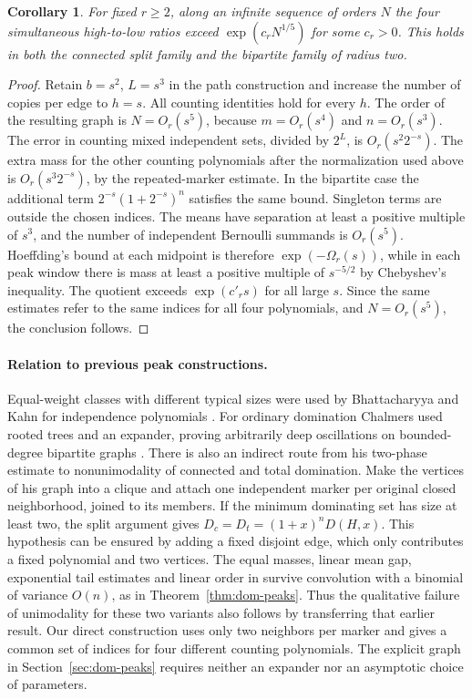 \documentclass[11pt,a4paper]{article}
\newtheorem{corollary}[theorem]{Corollary}
\begin{document}
\begin{corollary}\label{cor:power-contrast}
For fixed $r\ge2$, along an infinite sequence of orders $N$ the four simultaneous high-to-low ratios exceed $\exp(c_r N^{1/5})$ for some $c_r>0$. This holds in both the connected split family and the bipartite family of radius two.
\end{corollary}
\begin{proof}
Retain $b=s^2$, $L=s^3$ in the path construction and increase the number of copies per edge to $h=s$. All counting identities hold for every $h$. The order of the resulting graph is $N=O_r(s^5)$, because $m=O_r(s^4)$ and $n=O_r(s^3)$. The error in counting mixed independent sets, divided by $2^L$, is $O_r(s^2 2^{-s})$. The extra mass for the other counting polynomials after the normalization used above is $O_r(s^3 2^{-s})$, by the repeated-marker estimate. In the bipartite case the additional term $2^{-s}(1+2^{-s})^n$ satisfies the same bound. Singleton terms are outside the chosen indices. The means have separation at least a positive multiple of $s^3$, and the number of independent Bernoulli summands is $O_r(s^5)$. Hoeffding's bound at each midpoint is therefore $\exp(-\Omega_r(s))$, while in each peak window there is mass at least a positive multiple of $s^{-5/2}$ by Chebyshev's inequality. The quotient exceeds $\exp(c'_r s)$ for all large $s$. Since the same estimates refer to the same indices for all four polynomials, and $N=O_r(s^5)$, the conclusion follows.
\end{proof}

\paragraph{Relation to previous peak constructions.}\label{sec:prior-modes}
Equal-weight classes with different typical sizes were used by Bhattacharyya and Kahn for independence polynomials \cite{bk}. For ordinary domination Chalmers used rooted trees and an expander, proving arbitrarily deep oscillations on bounded-degree bipartite graphs \cite{chalmers}. There is also an indirect route from his two-phase estimate to nonunimodality of connected and total domination. Make the vertices of his graph into a clique and attach one independent marker per original closed neighborhood, joined to its members. If the minimum dominating set has size at least two, the split argument gives $D_c=D_t=(1+x)^n D(H,x)$. This hypothesis can be ensured by adding a fixed disjoint edge, which only contributes a fixed polynomial and two vertices. The equal masses, linear mean gap, exponential tail estimates and linear order in \cite[Proposition~3.2]{chalmers} survive convolution with a binomial of variance $O(n)$, as in Theorem~\ref{thm:dom-peaks}. Thus the qualitative failure of unimodality for these two variants also follows by transferring that earlier result. Our direct construction uses only two neighbors per marker and gives a common set of indices for four different counting polynomials. The explicit graph in Section~\ref{sec:dom-peaks} requires neither an expander nor an asymptotic choice of parameters.
\end{document}
